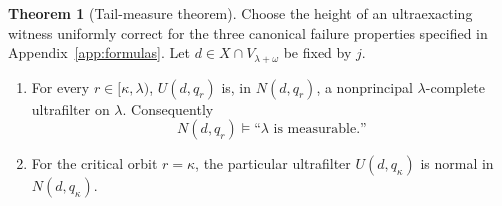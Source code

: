 \documentclass[11pt,letterpaper]{article}
\theoremstyle{definition}
\newtheorem{theorem}[definition]{Theorem}
\begin{document}
\begin{theorem}[Tail-measure theorem]\label{thm:tailmeasure}
Choose the height of an ultraexacting witness uniformly correct for the three canonical failure properties specified in Appendix~\ref{app:formulas}. Let $d\in X\cap V_{\lambda+\omega}$ be fixed by $j$.
\begin{enumerate}
\item For every $r\in[\kappa,\lambda)$, $U(d,q_r)$ is, in $N(d,q_r)$, a nonprincipal $\lambda$-complete ultrafilter on $\lambda$. Consequently
\[
                   N(d,q_r)\models\text{``$\lambda$ is measurable.''}
\]
\item For the critical orbit $r=\kappa$, the particular ultrafilter $U(d,q_\kappa)$ is normal in $N(d,q_\kappa)$.
\end{enumerate}
\end{theorem}
\end{document}
